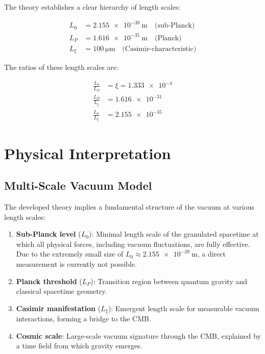 	The theory establishes a clear hierarchy of length scales:
	
	\begin{align}
		L_0 &= \SI{2.155e-39}{\meter} \quad \text{(sub-Planck)} \label{eq:L0_value}\\
		L_P &= \SI{1.616e-35}{\meter} \quad \text{(Planck)} \label{eq:LP_value}\\
		L_\xi &= \SI{100}{\micro\meter} \quad \text{(Casimir-characteristic)} \label{eq:Lxi_value}
	\end{align}
	
	The ratios of these length scales are:
	
	\begin{align}
		\frac{L_0}{L_P} &= \xi = \num{1.333e-4} \label{eq:L0_LP_ratio}\\
		\frac{L_P}{L_\xi} &= \num{1.616e-31} \label{eq:LP_Lxi_ratio}\\
		\frac{L_0}{L_\xi} &= \num{2.155e-35} \label{eq:L0_Lxi_ratio}
	\end{align}
	
	\section{Physical Interpretation}
	
	\subsection{Multi-Scale Vacuum Model}
	
	The developed theory implies a fundamental structure of the vacuum at various length scales:
	
	\begin{enumerate}
		\item \textbf{Sub-Planck level} (\( L_0 \)): Minimal length scale of the granulated spacetime at which all physical forces, including vacuum fluctuations, are fully effective. Due to the extremely small size of \( L_0 \approx \SI{2.155e-39}{\meter} \), a direct measurement is currently not possible.
		\item \textbf{Planck threshold} (\( L_P \)): Transition region between quantum gravity and classical spacetime geometry.
		\item \textbf{Casimir manifestation} (\( L_\xi \)): Emergent length scale for measurable vacuum interactions, forming a bridge to the CMB.
		\item \textbf{Cosmic scale}: Large-scale vacuum signature through the CMB, explained by a time field from which gravity emerges.
	\end{enumerate}
	
